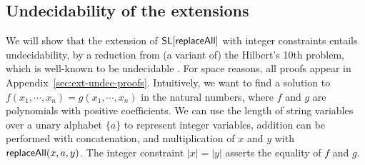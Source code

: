 %	


%	
 


\subsection{Undecidability of the extensions}

We will show that the extension of $\mathsf{SL}[\mathsf{replaceAll}]$ with integer constraints entails undecidability, by a reduction from (a variant of) the Hilbert's 10th problem, which is well-known to be undecidable \cite{Mat93}. 
For space reasons, all proofs appear in Appendix~\ref{sec:ext-undec-proofs}.
Intuitively, we want to find a solution to $f(x_1, \cdots, x_n)=g(x_1, \cdots, x_n)$ in the natural numbers, where $f$ and $g$ are polynomials with positive coefficients.
We can use the length of string variables over a unary alphabet $\{a\}$ to represent integer variables, addition can be performed with concatenation, and multiplication of $x$ and $y$ with $\mathsf{replaceAll}(x, a, y)$.
The integer constraint $|x| = |y|$ asserts the equality of $f$ and $g$.

